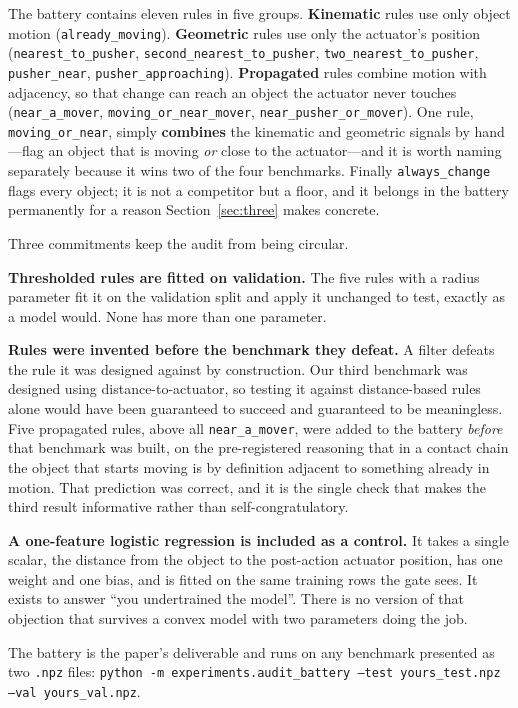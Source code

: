\documentclass{article}
\begin{document}
The battery contains eleven rules in five groups. \textbf{Kinematic} rules use only object
motion (\texttt{already\_moving}). \textbf{Geometric} rules use only the actuator's position
(\texttt{nearest\_to\_pusher}, \texttt{second\_nearest\_to\_pusher},
\texttt{two\_nearest\_to\_pusher}, \texttt{pusher\_near}, \texttt{pusher\_approaching}).
\textbf{Propagated} rules combine motion with adjacency, so that change can reach an object
the actuator never touches (\texttt{near\_a\_mover}, \texttt{moving\_or\_near\_mover},
\texttt{near\_pusher\_or\_mover}). One rule, \texttt{moving\_or\_near}, simply
\textbf{combines} the kinematic and geometric signals by hand---flag an object that is moving
\emph{or} close to the actuator---and it is worth naming separately because it wins two of the
four benchmarks. Finally \texttt{always\_change} flags every object; it is not a competitor but a floor, and it
belongs in the battery permanently for a reason Section~\ref{sec:three} makes concrete.

Three commitments keep the audit from being circular.

\textbf{Thresholded rules are fitted on validation.} The five rules with a radius parameter fit
it on the validation split and apply it unchanged to test, exactly as a model would. None has
more than one parameter.

\textbf{Rules were invented before the benchmark they defeat.} A filter defeats the rule it was
designed against by construction. Our third benchmark was designed using distance-to-actuator,
so testing it against distance-based rules alone would have been guaranteed to succeed and
guaranteed to be meaningless. Five propagated rules, above all \texttt{near\_a\_mover}, were
added to the battery \emph{before} that benchmark was built, on the pre-registered reasoning
that in a contact chain the object that starts moving is by definition adjacent to something
already in motion. That prediction was correct, and it is the single check that makes the third
result informative rather than self-congratulatory.

\textbf{A one-feature logistic regression is included as a control.} It takes a single scalar,
the distance from the object to the post-action actuator position, has one weight and one bias,
and is fitted on the same training rows the gate sees. It exists to answer ``you undertrained
the model''. There is no version of that objection that survives a convex model with two
parameters doing the job.

The battery is the paper's deliverable and runs on any benchmark presented as two \texttt{.npz}
files:
\texttt{python -m experiments.audit\_battery --test yours\_test.npz --val yours\_val.npz}.
\end{document}
